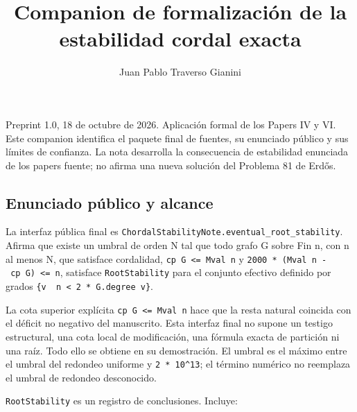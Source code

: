 \documentclass[spanish,11pt,a4paper]{article}
\title{Companion de formalización de la estabilidad cordal exacta}
\author{Juan Pablo Traverso Gianini}
\date{}
\begin{document}
\raggedbottom\maketitle
Preprint 1.0, 18 de octubre de 2026. Aplicación formal de los Papers IV
y VI. Este companion identifica el paquete final de fuentes, su
enunciado público y sus límites de confianza. La nota desarrolla la
consecuencia de estabilidad enunciada de los papers fuente; no afirma
una nueva solución del Problema 81 de Erdős.

\subsection{Enunciado público y
alcance}\label{enunciado-puxfablico-y-alcance}

La interfaz pública final es
\nolinkurl{ChordalStabilityNote.eventual_root_stability}. Afirma que
existe un umbral de orden N tal que todo grafo G sobre Fin n, con n al
menos N, que satisface cordalidad, \texttt{cp\ G\ \textless{}=\ Mval\ n}
y \texttt{2000\ *\ (Mval\ n\ -\ cp\ G)\ \textless{}=\ n}, satisface
\nolinkurl{RootStability} para el conjunto efectivo definido por grados
\texttt{\{v\ \textbar{}\ n\ \textless{}\ 2\ *\ G.degree\ v\}}.

La cota superior explícita \texttt{cp\ G\ \textless{}=\ Mval\ n} hace
que la resta natural coincida con el déficit no negativo del manuscrito.
Esta interfaz final no supone un testigo estructural, una cota local de
modificación, una fórmula exacta de partición ni una raíz. Todo ello se
obtiene en su demostración. El umbral es el máximo entre el umbral del
redondeo uniforme y \texttt{2\ *\ 10\^{}13}; el término numérico no
reemplaza el umbral de redondeo desconocido.

\nolinkurl{RootStability} es un registro de conclusiones. Incluye:
\end{document}
